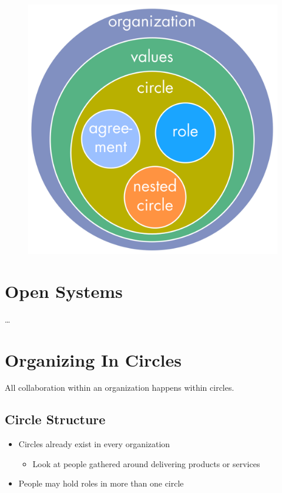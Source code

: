 \begin{figure}[htbp]
\centering
\includegraphics[keepaspectratio,width=\textwidth,height=0.75\textheight]{img/tension-driver-domain/nested-domains.png}
\end{figure}

\section{Open Systems}
\label{opensystems}

{\ldots}

\section{Organizing In Circles}
\label{organizingincircles}

All collaboration within an organization happens within circles.

\subsection{Circle Structure}
\label{circlestructure}

\begin{itemize}
\item Circles already exist in every organization

\begin{itemize}
\item Look at people gathered around delivering products or services

\end{itemize}

\item People may hold roles in more than one circle

\end{itemize}

